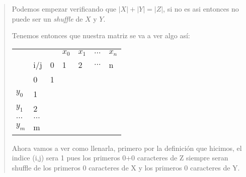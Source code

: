 \begin{quote}

    Podemos empezar verificando que $|X|+|Y|=|Z|$, si no es asi entonces
    no puede ser un \textit{shuffle} de $X$ y $Y$. \vspace{.2cm}

    Tenemos entonces que nuestra matriz se va a ver algo as\'i:

    \begin{table}[H]
        \centering
        \begin{tabular}{lllllll}
                &                              &                       & $x_0$                 & $x_1$                 & $\dots$               & $x_n$                 \\
                & i/j                          & 0                     & 1                     & 2                     & $\dots$               & n                     \\ \cline{3-7} 
                & \multicolumn{1}{l|}{0}       & \multicolumn{1}{l|}{1} & \multicolumn{1}{l|}{} & \multicolumn{1}{l|}{} & \multicolumn{1}{l|}{} & \multicolumn{1}{l|}{} \\ \cline{3-7} 
        $y_0$   & \multicolumn{1}{l|}{1}       & \multicolumn{1}{l|}{} & \multicolumn{1}{l|}{} & \multicolumn{1}{l|}{} & \multicolumn{1}{l|}{} & \multicolumn{1}{l|}{} \\ \cline{3-7} 
        $y_1$   & \multicolumn{1}{l|}{2}       & \multicolumn{1}{l|}{} & \multicolumn{1}{l|}{} & \multicolumn{1}{l|}{} & \multicolumn{1}{l|}{} & \multicolumn{1}{l|}{} \\ \cline{3-7} 
        $\dots$ & \multicolumn{1}{l|}{$\dots$} & \multicolumn{1}{l|}{} & \multicolumn{1}{l|}{} & \multicolumn{1}{l|}{} & \multicolumn{1}{l|}{} & \multicolumn{1}{l|}{} \\ \cline{3-7} 
        $y_m$   & \multicolumn{1}{l|}{m}       & \multicolumn{1}{l|}{} & \multicolumn{1}{l|}{} & \multicolumn{1}{l|}{} & \multicolumn{1}{l|}{} & \multicolumn{1}{l|}{} \\ \cline{3-7} 
        \end{tabular}
    \end{table}

    Ahora vamos a ver como llenarla, primero por la definición que hicimos, el indice
    (i,j) sera 1 pues los primeros 0+0 caracteres de Z siempre seran shuffle de los primeros
    0 caracteres de X y los primeros 0 caracteres de Y. \vspace{.2cm}


\end{quote}
